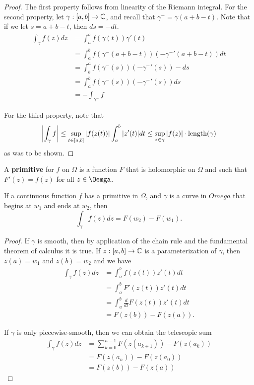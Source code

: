 \documentclass{exam}
\begin{document}
\begin{proof}
    The first property follows from linearity of the Riemann integral. For the second property, let $\gamma: [a, b]\to \mathbb{C}$, and 
    recall that $\gamma^- = \gamma(a + b - t)$. Note that if we let $s = a + b - t$, then $ds = -dt$.
    \begin{align*}
        \int_\gamma f(z)dz &= \int_a^b f(\gamma(t))\gamma'(t) \\
        &= \int_a^b f(\gamma^-(a + b - t))(-\gamma^-'(a + b - t))dt \\
        &= \int_b^a f(\gamma^-(s))(-\gamma^-'(s))-ds \\
        &= \int_a^b f(\gamma^-(s))(-\gamma^-'(s))ds \\
        &= -\int_{\gamma^-} f
    \end{align*}

    For the third property, note that
    $$\left| \int_\gamma f \right| \leq \sup_{t\in[a, b]}\left| f(z(t)) \right|\int_a^b |z'(t)|dt \leq \sup_{z\in\gamma} \left| f(z) \right| \cdot \text{length}(\gamma)$$
    as was to be shown.
\end{proof}

A \textbf{primitive} for $f$ on $\Omega$ is a function $F$ that is holomorphic on $\Omega$ and such that $F'(z) = f(z)$ for all $z\in\Oemga$. 
\noqed
\begin{theorem}\label{thm:main}
    If a continuous function $f$ has a primitive in $\Omega$, and $\gamma$ is a curve in $Omega$ that begins at $w_1$ and ends at $w_2$, then
    $$\int_\gamma f(z) dz = F(w_2) - F(w_1).$$
\end{theorem}
\yesqed
\begin{proof}
    If $\gamma$ is smooth, then by application of the chain rule and the fundamental theorem of calculus it is true. If $z: [a, b]\to\mathbb{C}$
    is a parameterization of $\gamma$, then $z(a) = w_1$ and $z(b) = w_2$ and we have
    \begin{align*}
        \int_\gamma f(z)dz &= \int_a^b f(z(t))z'(t)dt \\
        &= \int_a^b F'(z(t))z'(t)dt \\
        &= \int_a^b \frac{d}{dt} F(z(t))z'(t)dt \\
        &= F(z(b)) - F(z(a)).
    \end{align*}

    If $\gamma$ is only piecewise-smooth, then we can obtain the telescopic sum
    \begin{align*}
        \int_\gamma f(z)dz &= \sum_{k = 0}^{n - 1}F(z(a_{k + 1})) - F(z(a_k)) \\
        &= F(z(a_n)) - F(z(a_0)) \\
        &= F(z(b)) - F(z(a))
    \end{align*}
\end{proof}
\end{document}

